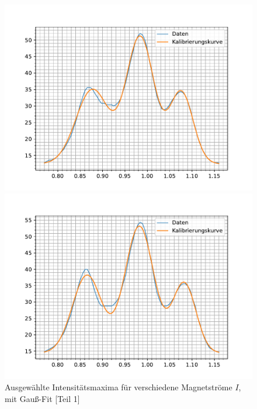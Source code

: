 \documentclass{article}
\begin{document}
\begin{figure}[h]
  \begin{minipage}{.49\linewidth}
    \centering
    \includegraphics[width=\linewidth]{gauss_6.0A.pdf}
  \end{minipage}
  \hfill
  \begin{minipage}{.49\linewidth}
    \centering
    \includegraphics[width=\linewidth]{gauss_7.0A.pdf}
  \end{minipage}
  \caption{Ausgewählte Intensitätsmaxima für verschiedene Magnetströme $I$, mit Gauß-Fit [Teil 1]}
  \label{fig:gauss-fit-1}
\end{figure}
\end{document}
